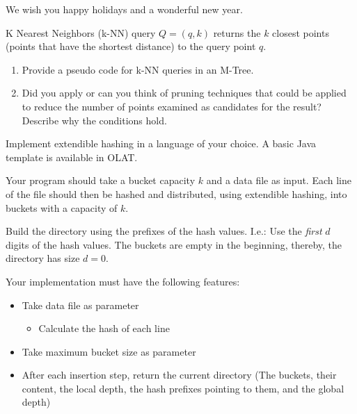 

\newcommand{\subtitle}{\textbf{Exercise 8}}
\newcommand{\outdate}{11.12.2023}
\newcommand{\duedate}{08.01.2024 12:00 MEZ}
\newcommand{\video}{040}







\begin{center}
\textsf{We wish you happy holidays and a wonderful new year.}
\end{center}
K Nearest Neighbors (k-NN) query $Q=(q, k)$ returns the $k$ closest points (points that have the shortest distance) to the query point $q$.

\begin{enumerate}
\item Provide a pseudo code for k-NN queries in an M-Tree.

\item Did you apply or can you think of pruning techniques that could be applied to reduce the number of points examined as candidates for the result? Describe why the conditions hold. 

\end{enumerate}

Implement extendible hashing in a language of your choice. A basic Java template is available in OLAT.

Your program should take a bucket capacity $k$ and a data file as input.
Each line of the file should then be hashed and distributed, using extendible hashing, into buckets with a capacity of $k$.

Build the directory using the prefixes of the hash values.
I.e.: Use the \emph{first} $d$ digits of the hash values.
The buckets are empty in the beginning, thereby, the directory has size $d=0$.

Your implementation must have the following features:
\begin{itemize}
\item Take data file as parameter
\begin{itemize}
  \item Calculate the hash of each line
\end{itemize}
\item Take maximum bucket size as parameter
\item After each insertion step, return the current directory (The buckets, their content, the local depth, the hash prefixes pointing to them, and the global depth)
\end{itemize}


